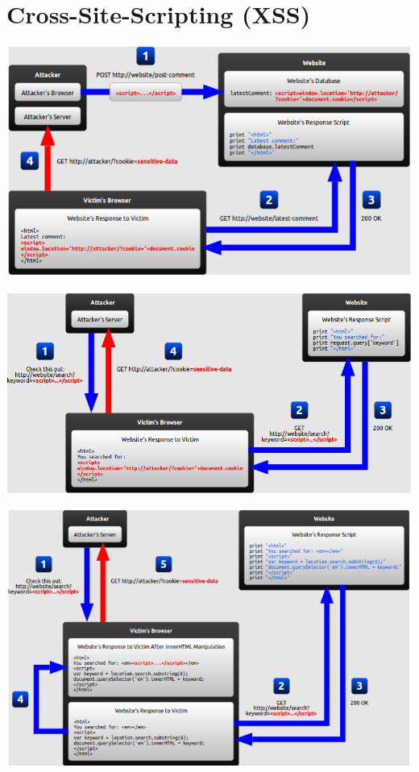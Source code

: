 \documentclass[11pt]{article}
\begin{document}
\section{Cross-Site-Scripting (XSS)}
\label{sec:org2f11741}
\begin{center}
\includegraphics[width=.9\linewidth]{./F10.png}
\end{center}
\begin{center}
\includegraphics[width=.9\linewidth]{./F11.png}
\end{center}
\begin{center}
\includegraphics[width=.9\linewidth]{./F12.png}
\end{center}
\end{document}
